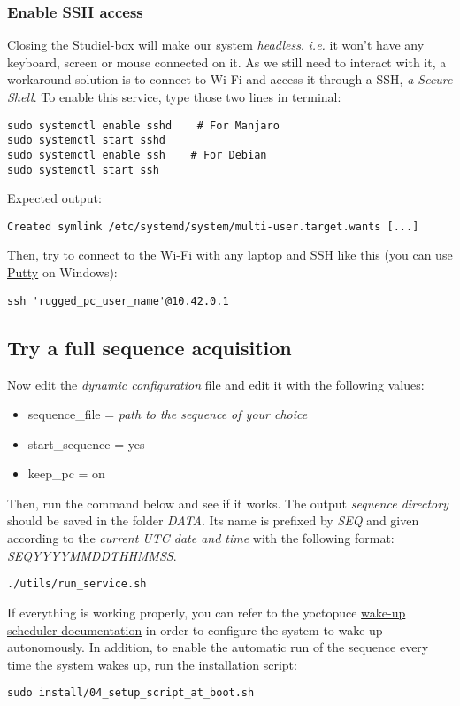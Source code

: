 \subsubsection{Enable SSH access}%
Closing the Studiel-box will make our system \emph{headless}.
\emph{i.e.} it won't have any keyboard, screen or mouse connected on it. 
As we still need to interact  with it, a workaround solution is to connect to Wi-Fi 
and access it through a SSH, 
\emph{a Secure Shell}. To enable this service, type those two lines in terminal:
\begin{lstlisting}
sudo systemctl enable sshd    # For Manjaro 
sudo systemctl start sshd
sudo systemctl enable ssh    # For Debian 
sudo systemctl start ssh
\end{lstlisting}
Expected output:
\vspace{-10pt}
\begin{lstlisting}
Created symlink /etc/systemd/system/multi-user.target.wants [...]
\end{lstlisting}
Then, try to connect to the Wi-Fi with any laptop and SSH like this 
(you can use \href{https://www.putty.org/}{Putty} on Windows):
\begin{lstlisting}
ssh 'rugged_pc_user_name'@10.42.0.1
\end{lstlisting}

\subsection{Try a full sequence acquisition}
Now edit the \textit{dynamic configuration} file and edit it with the
following values:
\begin{itemize}
	\item sequence\_file = \textit{path to the sequence of your choice} 
	\item start\_sequence = yes
	\item keep\_pc = on
\end{itemize}

Then, run the command below and see if it works. The output \textit{sequence
directory} should be saved in the folder \textit{DATA}. Its name is prefixed by
\textit{SEQ} and given according to the \textit{current UTC date and time} 
with the following format: \textit{SEQYYYYMMDDTHHMMSS}.
\begin{lstlisting}
./utils/run_service.sh
\end{lstlisting}
If everything is working properly, you can refer to the yoctopuce 
\href{https://www.yoctopuce.com/EN/products/yoctohub-wireless/doc/YHUBWLN1.usermanual.html#CHAP9SEC1}{wake-up scheduler documentation} 
in order to configure the system to wake up autonomously.
In addition, to enable the automatic run of the sequence every time the system
wakes up, run the installation script: 
\begin{lstlisting}
sudo install/04_setup_script_at_boot.sh
\end{lstlisting}

